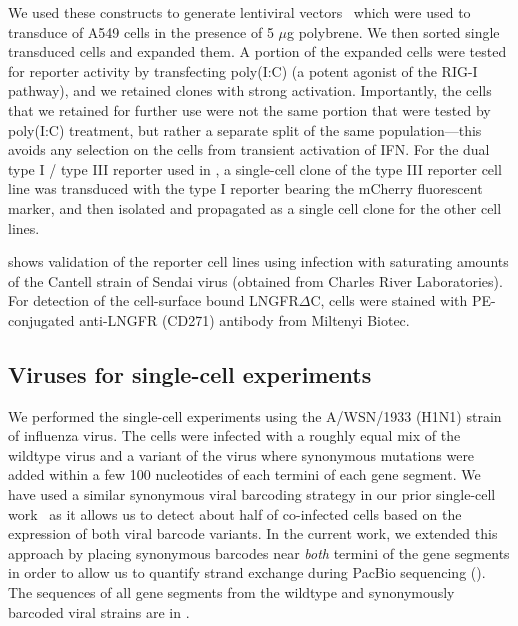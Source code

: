 \documentclass[9pt,lineno]{elife}
\begin{document}
We used these constructs to generate lentiviral vectors~\citep{oconnell2010lentiviral} which were used to transduce of A549 cells in the presence of 5 $\mu$g polybrene.
We then sorted single transduced cells and expanded them.
A portion of the expanded cells were tested for reporter activity by transfecting poly(I:C) (a potent agonist of the RIG-I pathway), and we retained clones with strong activation.
Importantly, the cells that we retained for further use were not the same portion that were tested by poly(I:C) treatment, but rather a separate split of the same population---this avoids any selection on the cells from transient activation of IFN.
For the dual type I / type III reporter used in , a single-cell clone of the type III reporter cell line was transduced with the type I reporter bearing the mCherry fluorescent marker, and then isolated and propagated as a single cell clone for the other cell lines.

 shows validation of the reporter cell lines using infection with saturating amounts of the Cantell strain of Sendai virus (obtained from Charles River Laboratories).
For detection of the cell-surface bound LNGFR$\Delta$C, cells were stained with PE-conjugated anti-LNGFR (CD271) antibody from Miltenyi Biotec.

\subsection{Viruses for single-cell experiments}
We performed the single-cell experiments using the A/WSN/1933 (H1N1) strain of influenza virus.
The cells were infected with a roughly equal mix of the wildtype virus and a variant of the virus where synonymous mutations were added within a few 100 nucleotides of each termini of each gene segment.
We have used a similar synonymous viral barcoding strategy in our prior single-cell work~\citep{russell2018extreme} as it allows us to detect about half of co-infected cells based on the expression of both viral barcode variants.
In the current work, we extended this approach by placing synonymous barcodes near \emph{both} termini of the gene segments in order to allow us to quantify strand exchange during PacBio sequencing ().
The sequences of all gene segments from the wildtype and synonymously barcoded viral strains are in .
\end{document}
